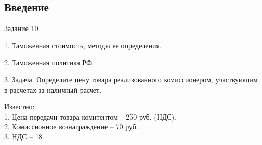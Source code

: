 \subsection*{Введение}
Задание 10

1. Таможенная стоимость, методы ее определения.

2. Таможенная политика РФ.

3. Задача. Определите цену товара реализованного комиссионером,
участвующим в расчетах за наличный расчет.

Известно:\\
1. Цена передачи товара комитентом – 250 руб. (НДС).\\
2. Комиссионное вознаграждение – 70 руб.\\
3. НДС – 18%